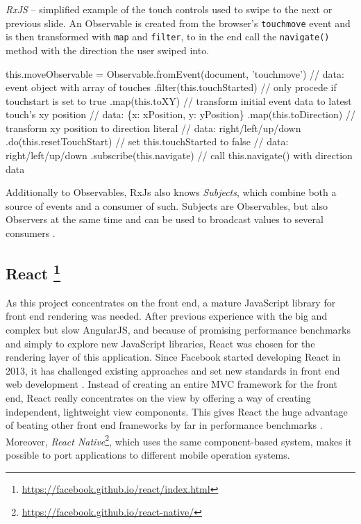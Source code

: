\begin{program}
\caption{\emph{RxJS} -- simplified example of the touch controls used to swipe to the next or previous slide. An Observable is created from the browser's \texttt{touchmove} event and is then transformed with \texttt{map} and \texttt{filter}, to in the end call the \texttt{navigate()} method with the direction the user swiped into.}
\label{prog:implementation-technologies-rxjs}
\begin{JsCode}
this.moveObservable = Observable.fromEvent(document, 'touchmove')
  // data: event object with array of touches
  .filter(this.touchStarted) // only procede if touchstart is set to true
  .map(this.toXY) // transform initial event data to latest touch's xy position
  // data: \{x: xPosition, y: yPosition\}
  .map(this.toDirection) // transform xy position to direction literal
  // data: right/left/up/down
  .do(this.resetTouchStart) // set this.touchStarted to false
  // data: right/left/up/down
  .subscribe(this.navigate) // call this.navigate() with direction data
\end{JsCode}
\end{program}

Additionally to Observables, RxJs also knows \emph{Subjects}, which combine both a source of events and a consumer of such. Subjects are Observables, but also Observers at the same time and can be used to broadcast values to several consumers \cite{rxjs-docu}.

\subsection[React]%
             {React%
             \protect\footnote{\url{https://facebook.github.io/react/index.html}}}%
\label{sec:implementation-technologies-react}

As this project concentrates on the front end, a mature JavaScript library for front end rendering was needed. After previous experience with the big and complex but slow AngularJS, and because of promising performance benchmarks \cite{react-benchmarks} and simply to explore new JavaScript libraries, React was chosen for the rendering layer of this application. Since Facebook started developing React in 2013, it has challenged existing approaches and set new standards in front end web development \cite{introduction-to-react}. Instead of creating an entire MVC framework for the front end, React really concentrates on the view by offering a way of creating independent, lightweight view components. This gives React the huge advantage of beating other front end frameworks by far in performance benchmarks \cite{react-benchmarks}. Moreover, \emph{React Native}\footnote{\url{https://facebook.github.io/react-native/}}, which uses the same component-based system, makes it possible to port applications to different mobile operation systems.

